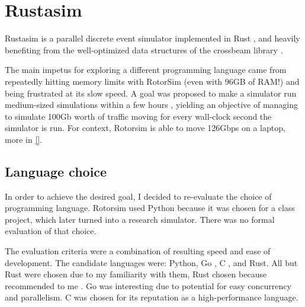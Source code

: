 \section{Rustasim} \label{rustasim}

Rustasim \cite{brode-roger_nibriviarustasim_2020} is a parallel discrete event simulator implemented in Rust \cite{klabnik_rust_2018}\cite{matsakis_rust_2014}, and heavily benefiting from the well-optimized data structures of the crossbeam library \cite{noauthor_crossbeam-rscrossbeam_2020}.

The main impetus for exploring a different programming language came from repeatedly hitting memory limits with RotorSim (even with 96GB of RAM!) and being frustrated at its slow speed. 
A goal was proposed to make a simulator run medium-sized simulations within a few hours , yielding an objective of managing to simulate 100Gb  worth of traffic moving for every wall-clock second the simulator is run.
For context, Rotorsim is able to move 126Gbps on a laptop, more in \ref{}. 


\subsection{Language choice} \label{rustasim-language}

In order to achieve the desired goal, I decided to re-evaluate the choice of programming language.
Rotorsim used Python because it was chosen for a class project, which later turned into a research simulator. 
There was no formal evaluation of that choice. 

The evaluation criteria were a combination of resulting speed and ease of development.
The candidate languages were: Python, Go \cite{donovan_go_2015}, C \cite{kernighan_c_1988}, and Rust.
All but Rust were chosen due to my familiarity with them, Rust chosen because recommended to me .
Go was interesting due to potential for easy concurrency and parallelism.
C was chosen for its reputation as a high-performance language.

